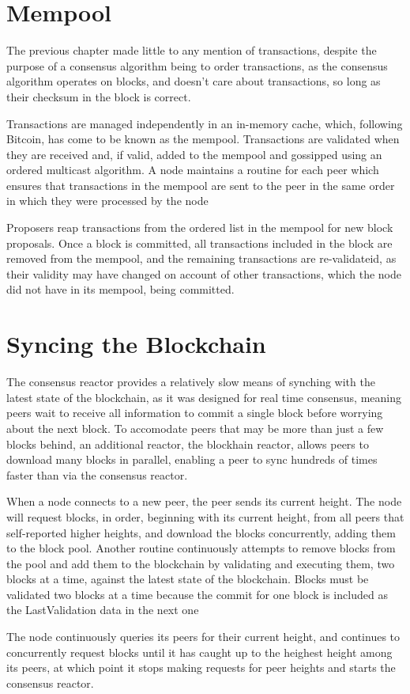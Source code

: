 \section{Mempool}

The previous chapter made little to any mention of transactions, 
despite the purpose of a consensus algorithm being to order transactions,
as the consensus algorithm operates on blocks, and doesn't care about transactions,
so long as their checksum in the block is correct.

Transactions are managed independently in an in-memory cache, 
which, following Bitcoin, has come to be known as the mempool. 
Transactions are validated when they are received and, if valid, added to the mempool and gossipped using an ordered multicast algorithm.
A node maintains a routine for each peer which ensures that transactions in the mempool are sent to the peer in the same order in which they were processed by the node

Proposers reap transactions from the ordered list in the mempool for new block proposals.
Once a block is committed, all transactions included in the block are removed from the mempool,
and the remaining transactions are re-validateid,
as their validity may have changed on account of other transactions, which the node did not have in its mempool, being committed. 


\section{Syncing the Blockchain}

The consensus reactor provides a relatively slow means of synching with the latest state of the blockchain,
as it was designed for real time consensus,
meaning peers wait to receive all information to commit a single block before worrying about the next block.
To accomodate peers that may be more than just a few blocks behind, 
an additional reactor, the blockhain reactor, allows peers to download many blocks in parallel,
enabling a peer to sync hundreds of times faster than via the consensus reactor.

When a node connects to a new peer, the peer sends its current height.
The node will request blocks, in order, beginning with its current height,
from all peers that self-reported higher heights, and download the blocks concurrently, adding them to the block pool.
Another routine continuously attempts to remove blocks from the pool and add them to the blockchain by validating and executing them, 
two blocks at a time, against the latest state of the blockchain.
Blocks must be validated two blocks at a time because the commit for one block is included as the LastValidation data in the next one

The node continuously queries its peers for their current height, 
and continues to concurrently request blocks until it has caught up to the heighest height among its peers, 
at which point it stops making requests for peer heights and starts the consensus reactor.


